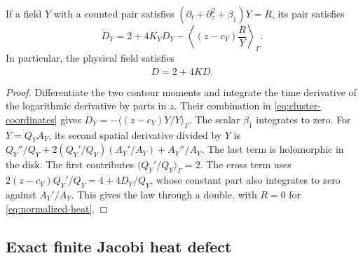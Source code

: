 \begin{proposition}
\label{prop:gt-pair-law}
If a field \(Y\) with a counted pair satisfies
\((\partial_t+\partial_z^2+\beta_1)Y=R\), its pair satisfies
\[
 \dot D_Y=2+4K_YD_Y
 -\left\langle (z-c_Y)\frac{R}{Y}\right\rangle_\Gamma .
\]
In particular, the physical field satisfies
\begin{equation}
 \dot D=2+4KD .
 \label{eq:gt-gap-law}
\end{equation}
\end{proposition}
\begin{proof}
Differentiate the two contour moments and integrate the time
derivative of the logarithmic derivative by parts in \(z\).
Their combination in \eqref{eq:cluster-coordinates} gives
\(\dot D_Y=-\langle(z-c_Y)\dot Y/Y\rangle_\Gamma\).
The scalar \(\beta_1\) integrates to zero. For \(Y=Q_YA_Y\), its
second spatial derivative divided by \(Y\) is
\(Q_Y''/Q_Y+2(Q_Y'/Q_Y)(A_Y'/A_Y)+A_Y''/A_Y\).
The last term is holomorphic in the disk. The first contributes
\(\langle Q_Y'/Q_Y\rangle_\Gamma=2\). The cross term uses
\(2(z-c_Y)Q_Y'/Q_Y=4+4D_Y/Q_Y\), whose constant part also
integrates to zero against \(A_Y'/A_Y\). This gives the law
through a double, with \(R=0\) for \eqref{eq:normalized-heat}.
\end{proof}

\subsection{Exact finite Jacobi heat defect}
\label{sec:gt-finite-defect}

